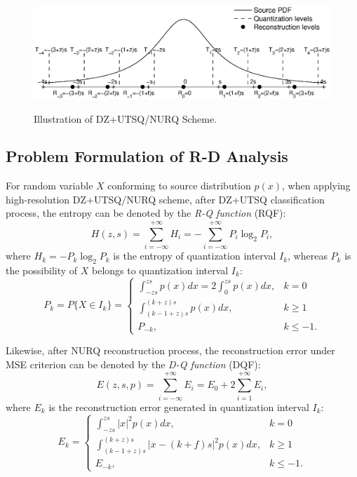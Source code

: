 \documentclass[smallabstract,smallcaptions]{dccpaper}
\begin{document}
\begin{figure}[tp]
\centering
\includegraphics[width = 1.0\linewidth]{Figures/section2/DZ+UTSQ_NURQ}\\
\caption{\label{fig:DZ+UTSQ_NURQ}%
Illustration of DZ+UTSQ/NURQ Scheme.}
\vspace{5pt}
\end{figure}

\subsection{Problem Formulation of R-D Analysis}
For random variable $X$ conforming to source distribution $p(x)$, when applying high-resolution DZ+UTSQ/NURQ scheme, after DZ+UTSQ classification process, the entropy can be denoted by the \emph{R-Q function} (RQF):
\begin{equation}\label{equ:formula-rq}
	H(z, s) = \sum_{i=-\infty}^{+\infty} H_i
	= -\sum_{i=-\infty}^{+\infty} P_i \log_2 P_i ,
\end{equation}
where $H_k = - P_k \log_2 P_k$ is the entropy of quantization interval $I_k$, whereas $P_k$ is the possibility of $X$ belongs to quantization interval $I_{k}$:
\begin{equation}\label{equ:formula-pk}
	P_k = P\{X \in I_k\} =
	\begin{cases}
		\int_{-z s}^{z s} p(x) dx
		= 2 \int_{0}^{z s} p(x) dx,
		& k=0 \\
		\int_{(k-1+z) s}^{(k+z) s} p(x) dx,
		& k \ge 1 \\
		P_{-k},
		& k \le -1 .
	\end{cases}
\end{equation}  

Likewise, after NURQ reconstruction process, the reconstruction error under MSE criterion can be denoted by the \emph{D-Q function} (DQF):
\begin{equation}\label{equ:formula-dq}
	E(z, s, p) =\sum_{i=-\infty}^{+\infty} E_i
	=E_0 + 2 \sum_{i=1}^{+\infty} E_i ,
\end{equation}
where $E_k$ is the reconstruction error generated in quantization interval $I_k$:
\begin{equation}\label{equ:formula-dk}
	E_k=
	\begin{cases}
		\int_{-z s}^{z s} |x|^2 p(x) dx,
		& k=0 \\
		\int_{(k-1+z) s}^{(k+z) s} |x - (k+f) s|^2 p(x) dx,
		& k \ge 1 \\
		E_{-k},
		& k \le -1 .
	\end{cases}
\end{equation}
\end{document}
